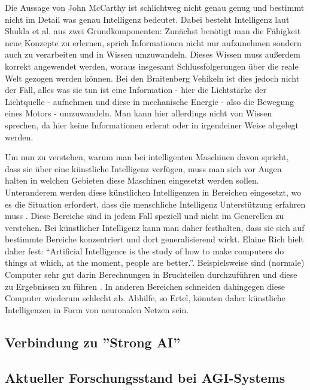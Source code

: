     Die Aussage von John McCarthy ist schlichtweg nicht genau genug und bestimmt nicht im Detail was
    genau Intelligenz bedeutet. Dabei besteht Intelligenz laut Shukla et al. aus zwei Grundkomponenten: 
    Zunächst benötigt man die Fähigkeit neue Konzepte zu erlernen, sprich Informationen nicht nur 
    aufzunehmen sondern auch zu verarbeiten und in Wissen umzuwandeln. Dieses Wissen muss außerdem 
    korrekt angewendet werden, woraus insgesamt Schlussfolgerungen über die reale Welt gezogen werden 
    können. \cite{shukla2013applicability} Bei den Braitenberg Vehikeln ist dies jedoch nicht der Fall,
    alles was sie tun ist eine Information - hier die Lichtstärke der Lichtquelle - aufnehmen und diese
    in mechanische Energie - also die Bewegung eines Motors - umzuwandeln. Man kann hier allerdings nicht
    von Wissen sprechen, da hier keine Informationen erlernt oder in irgendeiner Weise abgelegt werden.
    
    Um nun zu verstehen, warum man bei intelligenten Maschinen davon spricht, dass sie über eine 
    künstliche Intelligenz verfügen, muss man sich vor Augen halten in welchen Gebieten diese Maschinen
    eingesetzt werden sollen. Unteranderem werden diese künstlichen Intelligenzen in Bereichen eingesetzt,
    wo es die Situation erfordert, dass die menschliche Intelligenz Unterstützung erfahren muss \cite[p. 2]{ertel2016grundkurs}.
    Diese Bereiche sind in jedem Fall speziell und nicht im Generellen zu verstehen. Bei künstlicher Intelligenz
    kann man daher festhalten, dass sie sich auf bestimmte Bereiche konzentriert und dort generalisierend wirkt.
    Elaine Rich hielt daher fest: ``Artificial Intelligence is the study of how to make computers do things at which,
    at the moment, people are better.''. Beispielsweise sind (normale) Computer sehr gut darin Berechnungen in Bruchteilen
    durchzuführen und diese zu Ergebnissen zu führen \cite[p. 3]{ertel2016grundkurs}. In anderen Bereichen schneiden
    dahingegen diese Computer wiederum schlecht ab. Abhilfe, so Ertel, könnten daher künstliche Intelligenzen in Form von
    neuronalen Netzen sein.
    \subsection{Verbindung zu ''Strong AI''}

    \cite{huang_beef}
    \subsection{Aktueller Forschungsstand bei AGI-Systems}
    
